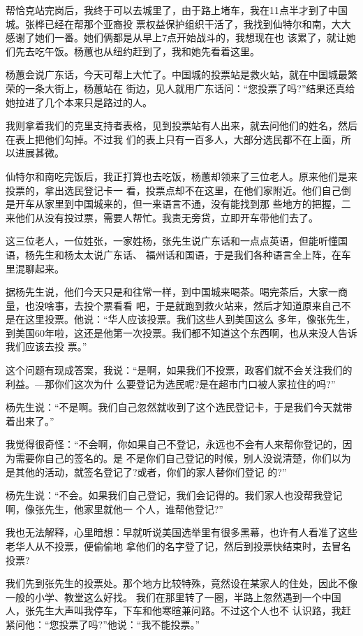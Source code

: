 ﻿\documentclass[11pt]{article}
\begin{document}
帮恰克站完岗后，我终于可以去城里了，由于路上堵车，我在11点半才到了中国城。张桦已经在帮那个亚裔投
票权益保护组织干活了，我找到仙特尔和南，大大感谢了她们一番。她们俩都是从早上7点开始战斗的，我想现在也
该累了，就让她们先去吃午饭。杨蕙也从纽约赶到了，我和她先看着这里。

杨蕙会说广东话，今天可帮上大忙了。中国城的投票站是救火站，就在中国城最繁荣的一条大街上，杨蕙站在
街边，见人就用广东话问：``您投票了吗?''结果还真给她拉进了几个本来只是路过的人。

我则拿着我们的克里支持者表格，见到投票站有人出来，就去问他们的姓名，然后在表上把他们勾掉。不过我
们的表上只有一百多人，大部分选民都不在上面，所以进展甚微。

仙特尔和南吃完饭后，我正打算也去吃饭，杨蕙却领来了三位老人。原来他们是来投票的，拿出选民登记卡一
看，投票点却不在这里，在他们家附近。他们自己倒是开车从家里到中国城来的，但一来语言不通，没有能找到那
些地方的把握，二来他们从没有投过票，需要人帮忙。我责无旁贷，立即开车带他们去了。

这三位老人，一位姓张，一家姓杨，张先生说广东话和一点点英语，但能听懂国语，杨先生和杨太太说广东话、
福州话和国语，于是我们各种语言全上阵，在车里混聊起来。

据杨先生说，他们今天只是和往常一样，到中国城来喝茶。喝完茶后，大家一商量，也没啥事，去投个票看看
吧，于是就跑到救火站来，然后才知道原来自己不是在这里投票。他说：``华人应该投票。我们这些人到美国这么
多年，像张先生，到美国60年啦，这还是他第一次投票。我们都不知道这个东西啊，也从来没人告诉我们应该去投
票。''

这个问题有现成答案，我说：``是啊，如果我们不投票，政客们就不会关注我们的利益。---那你们这次为什
么要登记为选民呢?是在超市门口被人家拉住的吗?''

杨先生说：``不是啊。我们自己忽然就收到了这个选民登记卡，于是我们今天就带着出来了。''

我觉得很奇怪：``不会啊，你如果自己不登记，永远也不会有人来帮你登记的，因为需要你自己的签名的。是
不是你们自己登记的时候，别人没说清楚，你们以为是其他的活动，就签名登记了?或者，你们的家人替你们登记
的?''

杨先生说：``不会。如果我们自己登记，我们会记得的。我们家人也没帮我登记啊，像张先生，他家里就他一
个人，谁帮他登记?''

我也无法解释，心里暗想：早就听说美国选举里有很多黑幕，也许有人看准了这些老华人从不投票，便偷偷地
拿他们的名字登了记，然后到投票快结束时，去冒名投票?

我们先到张先生的投票处。那个地方比较特殊，竟然设在某家人的住处，因此不像一般的小学、教堂这么好找。
我们在那里转了一圈，半路上忽然遇到一个中国人，张先生大声叫我停车，下车和他寒暄兼问路。不过这个人也不
认识路，我赶紧问他：``您投票了吗?''他说：``我不能投票。''
\end{document}
